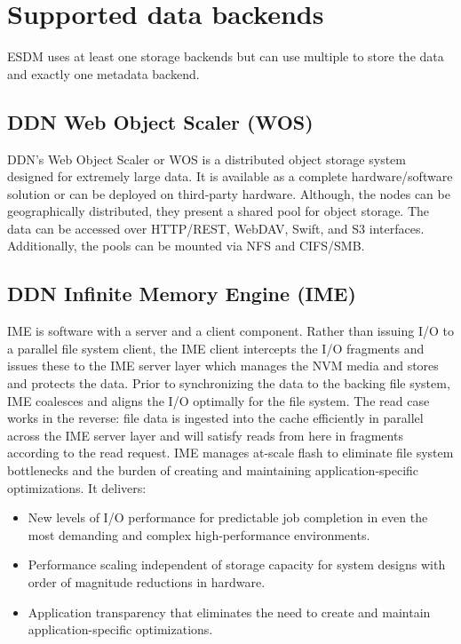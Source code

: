 \section{Supported data backends}
ESDM uses at least one storage backends but can use multiple to store the data and exactly one metadata backend.


\subsection{DDN Web Object Scaler (WOS)}
DDN's Web Object Scaler or WOS is a distributed object storage system designed for extremely large data. 
It is available as a complete hardware/software solution or can be deployed on third-party hardware.
Although, the nodes can be geographically distributed, they present a shared pool for object storage. 
The data can be accessed over HTTP/REST, WebDAV, Swift, and S3 interfaces.
Additionally, the pools can be mounted via NFS and CIFS/SMB. 

\subsection{DDN Infinite Memory Engine (IME)}
IME is software with a server and a client component. 
Rather than issuing I/O to a parallel file system client, the IME client intercepts the I/O fragments and issues these to the IME server layer which manages the NVM media and stores and protects the data.
Prior to synchronizing the data to the backing file system, IME coalesces and aligns the I/O optimally for the file system. 
The read case works in the reverse: file data is ingested into the cache efficiently in parallel across the
IME server layer and will satisfy reads from here in fragments according to the read request. 
IME manages at-scale flash to eliminate file system bottlenecks and the burden of creating and maintaining application-specific optimizations. 
It delivers:

\begin{itemize}
  \item New levels of I/O performance for predictable job completion in even the most demanding and complex high-performance environments.
  \item Performance scaling independent of storage capacity for system designs with order of magnitude reductions in hardware.
  \item Application transparency that eliminates the need to create and maintain application-specific optimizations.
\end{itemize}

